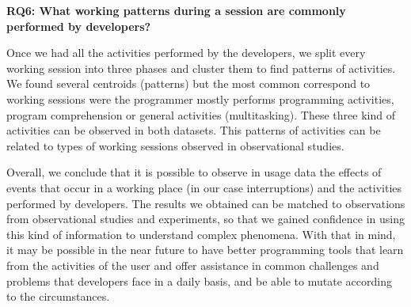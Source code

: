 \textbf{RQ6: What working patterns during a session are commonly performed by developers?}

Once we had all the activities performed by the developers, we split every working session into three phases and cluster them to find patterns of activities. We found several centroids (patterns) but the most common correspond to working sessions were the programmer mostly performs programming activities, program comprehension or general activities (multitasking). These three kind of activities can be observed in both datasets. This patterns of activities can be related to types of working sessions observed in observational studies.

Overall, we conclude that it is possible to observe in usage data the effects of events that occur in a working place (in our case interruptions) and the activities performed by developers. The results we obtained can be matched to observations from observational studies and experiments, so that we gained confidence in using this kind of information to understand complex phenomena. With that in mind, it may be possible in the near future to have better programming tools that learn from the activities of the user and offer assistance in common challenges and problems that developers face in a daily basis, and be able to mutate according to the circumstances.

